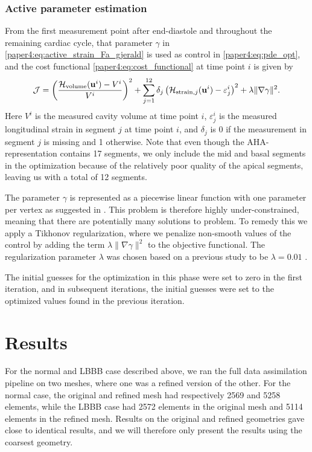 \subsubsection{Active parameter estimation}
\label{paper4:sec:active_param_estim}
From the first measurement point after end-diastole and throughout the
remaining cardiac cycle, that parameter $\gamma$ in
\eqref{paper4:eq:active_strain_Fa_gjerald} is used as control in
\eqref{paper4:eq:pde_opt}, and the cost functional \eqref{paper4:eq:cost_functional}
at time point $i$ is given by 
\begin{align}
  \mathcal{J} =
   \left(\frac{\mathcal{H}_{\mathrm{volume}}(\mathbf{u}^i)
  - V^i}{V^i} \right)^2 +
  \sum_{j=1}^{12} \delta_j \left( \mathcal{H}_{\mathrm{strain}, j}(\mathbf{u}^i)
  - \varepsilon_{j}^i \right)^2  + \lambda \| \nabla \gamma \|^2.
\end{align}
Here $V^i$ is the measured cavity volume at time point $i$, 
$\varepsilon_{j}^i$ is the measured longitudinal strain in segment $j$
at time point $i$, and $\delta_j$ is 0 if the measurement in segment
$j$ is missing and 1 otherwise. Note that even though the  
AHA-representation \cite{cerqueira2002standardized} contains 17
segments, we only include the mid and basal segments in the
optimization because of the relatively poor quality of the apical
segments, leaving us with a total of 12 segments.

The parameter $\gamma$ is represented as a piecewise linear function
with one parameter per vertex as suggested in \cite{balaban2017high}.
This problem is therefore highly under-constrained, meaning that there
are potentially many solutions to problem. To remedy this we apply a
Tikhonov regularization, where we penalize non-smooth values of the
control by adding the term $\lambda \| \nabla \gamma \|^2$ to the
objective functional. The regularization parameter $\lambda$
was chosen based on a previous study to be $\lambda=0.01$ \cite{balaban2017high}.

The initial guesses for the optimization in this phase were set to
zero in the first iteration, and in subsequent iterations, the initial
guesses were set to the optimized values found in the previous iteration.

\section{Results}
For the normal and LBBB case described above, we ran the
full data assimilation pipeline on two meshes, where one was a refined version of the
other. For the normal case, the original and refined mesh had
respectively 2569 and 5258 elements, while the LBBB case
had 2572 elements in the original mesh and 5114 elements in the
refined mesh. Results on the original and refined geometries gave
close to identical results, and we will therefore only present the
results using the coarsest geometry. 

